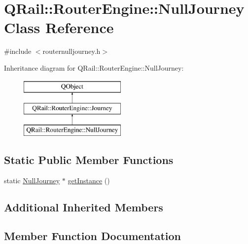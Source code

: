 \hypertarget{classQRail_1_1RouterEngine_1_1NullJourney}{}\section{Q\+Rail\+::Router\+Engine\+::Null\+Journey Class Reference}
\label{classQRail_1_1RouterEngine_1_1NullJourney}


{\ttfamily \#include $<$routernulljourney.\+h$>$}

Inheritance diagram for Q\+Rail\+::Router\+Engine\+::Null\+Journey\+:\begin{figure}[H]
\begin{center}
\leavevmode
\includegraphics[height=3.000000cm]{classQRail_1_1RouterEngine_1_1NullJourney}
\end{center}
\end{figure}
\subsection*{Static Public Member Functions}
\begin{DoxyCompactItemize}
\item 
static \mbox{\hyperlink{classQRail_1_1RouterEngine_1_1NullJourney}{Null\+Journey}} $\ast$ \mbox{\hyperlink{classQRail_1_1RouterEngine_1_1NullJourney_aeb77bc5f13862ab95fd2f776f43e3661}{get\+Instance}} ()
\end{DoxyCompactItemize}
\subsection*{Additional Inherited Members}


\subsection{Member Function Documentation}
\mbox{\label{classQRail_1_1RouterEngine_1_1NullJourney_aeb77bc5f13862ab95fd2f776f43e3661}} 
